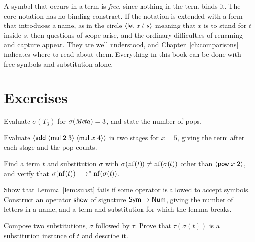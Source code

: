 A symbol that occurs in a term is \emph{free}, since nothing in the term binds it. The core notation has no binding construct. If the notation is extended with a form that introduces a name, as in the circle $\langle \mathsf{let}\; x\; t\; s\rangle$ meaning that $x$ is to stand for $t$ inside $s$, then questions of scope arise, and the ordinary difficulties of renaming and capture appear. They are well understood, and Chapter~\ref{ch:comparisons} indicates where to read about them. Everything in this book can be done with free symbols and substitution alone.

\section*{Exercises}

\begin{exercise}[\dag]\label{ex:ch6-tower}
Evaluate $\sigma(T_3)$ for $\sigma(\mathit{Meta})=3$, and state the number of pops.
\end{exercise}

\begin{exercise}[\dag]\label{ex:ch6-staged}
Evaluate $\langle \mathsf{add}\; \langle \mathsf{mul}\; 2\; 3\rangle\; \langle \mathsf{mul}\; x\; 4\rangle\rangle$ in two stages for $x=5$, giving the term after each stage and the pop counts.
\end{exercise}

\begin{exercise}[\dag]\label{ex:ch6-noteq}
Find a term $t$ and substitution $\sigma$ with $\sigma(\operatorname{nf}(t))\ne\operatorname{nf}(\sigma(t))$ other than $\langle \mathsf{pow}\; x\; 2\rangle$, and verify that $\sigma(\operatorname{nf}(t))\longrightarrow^{*}\operatorname{nf}(\sigma(t))$.
\end{exercise}

\begin{exercise}
Show that Lemma~\ref{lem:subst} fails if some operator is allowed to accept symbols. Construct an operator $\mathsf{show}$ of signature $\mathsf{Sym}\to\mathsf{Num}$, giving the number of letters in a name, and a term and substitution for which the lemma breaks.
\end{exercise}

\begin{exercise}
Compose two substitutions, $\sigma$ followed by $\tau$. Prove that $\tau(\sigma(t))$ is a substitution instance of $t$ and describe it.
\end{exercise}
